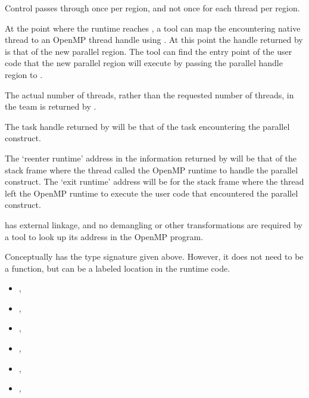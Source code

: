 Control passes through 
once per region, and not once for each thread per region.

At the point where the runtime reaches ,
a tool can map the encountering native thread to an OpenMP
thread handle using
.
At this point the handle returned by 
is that of the new parallel region.
The tool can find the entry point of the user code that
the new parallel region will execute by passing the parallel handle region
to .

The actual number of threads, rather than the requested number of threads,
in the team is returned by
.

The task handle returned by
will be that of the task encountering the parallel construct.

The `reenter runtime' address in the information returned by
will be that of the stack frame where the thread called the OpenMP
runtime to handle the parallel construct.
The `exit runtime' address will be for the stack frame where the thread
left the OpenMP runtime to execute the user code that encountered
the parallel construct.

\restrictions

 has external  linkage, and no
demangling or other transformations are required by a tool
to look up its address in the OpenMP program.

Conceptually  has the type signature
given above.
However, it does not need to be a function, but can be a labeled location
in the runtime code.

\crossreferences

\begin{itemize}
\item
  , 
\item
  , 
\item
  , 
\item
  , 
\item
  , 
\item
  , 
\end{itemize}

